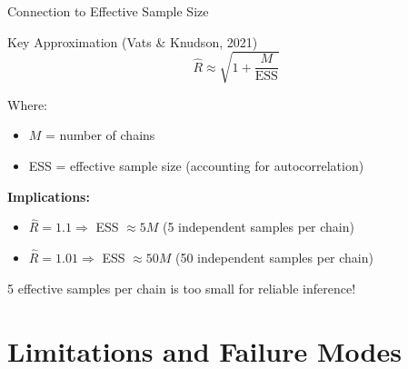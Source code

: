 \begin{frame}{Connection to Effective Sample Size}
	\begin{block}{Key Approximation (Vats \& Knudson, 2021)}
		$$\hat{R} \approx \sqrt{1 + \frac{M}{\text{ESS}}}$$
	\end{block}

	Where:
	\begin{itemize}
		\item $M$ = number of chains
		\item ESS = effective sample size (accounting for autocorrelation)
	\end{itemize}

	\vspace{0.5cm}
	\textbf{Implications:}
	\begin{itemize}
		\item $\hat{R} = 1.1 \Rightarrow$ ESS $\approx 5M$ (5 independent samples per chain)
		\item $\hat{R} = 1.01 \Rightarrow$ ESS $\approx 50M$ (50 independent samples per chain)
	\end{itemize}

	\vspace{0.3cm}
	\begin{center}
		\color{copenhagenred} 5 effective samples per chain is too small for reliable inference!
	\end{center}
\end{frame}

\section{Limitations and Failure Modes}

